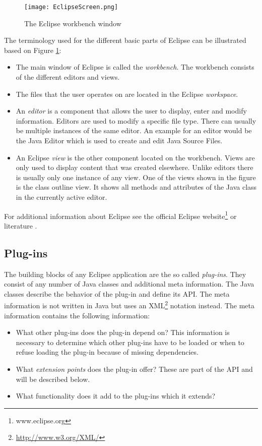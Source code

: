 \begin{figure}
  \centering
  \texttt{[image: EclipseScreen.png]}
  \caption[The Eclipse workbench window]%
  {The Eclipse workbench window\protect}
  \label{fig:EclipseScreen}
\end{figure}
The terminology used for the different basic parts of Eclipse can be illustrated based on Figure
\ref{fig:EclipseScreen}:
\begin{itemize}
 \item The main window of Eclipse is called the \textit{workbench}. The workbench consists of the 
different editors and views.
 \item The files that the user operates on are located in the Eclipse \textit{workspace}. 
 \item An \textit{editor} is a component that allows the user to display, enter and modify information.
Editors are used to modify a specific file type. There can usually be multiple instances of the same editor.
An example for an editor would be the Java Editor which is used to create and edit Java Source Files.
 \item An Eclipse \textit{view} is the other component located on the workbench. Views are only used to
display content that was created elsewhere. Unlike editors there is usually only one instance of any view.
One of the views shown in the figure is the class outline view. It shows all methods and attributes of the 
Java class in the currently active editor.
\end{itemize}

For additional information about Eclipse see the official Eclipse website\footnote{www.eclipse.org} or literature \cite{eclipsePlugins}.

\subsection{Plug-ins}
\label{section:ConfTechPlugins}
The building blocks of any Eclipse application are the so called \textit{plug-ins}. They
consist of any number of Java classes and additional meta information. The Java classes
describe the behavior of the plug-in and define its \ac{API}. The meta information is not written
in Java but uses an \ac{XML}\footnote{\url{http://www.w3.org/XML/}} notation instead. The meta information contains the following
information:
\begin{itemize}
 \item What other plug-ins does the plug-in depend on? This information is necessary to determine
which other plug-ins have to be loaded or when to refuse loading the plug-in because of missing
dependencies.
 \item What \textit{extension points} does the plug-in offer? These are part of the \ac{API} and
will be described below.
 \item What functionality does it add to the plug-ins which it extends?
\end{itemize}


